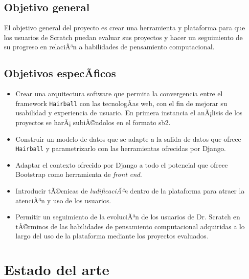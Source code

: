 \documentclass[a4paper, 12pt]{book}
\begin{document}
\section{Objetivo general}
\label{sec:objetivo-general}

El objetivo general del proyecto es crear una herramienta y plataforma para que los
usuarios de Scratch puedan evaluar sus proyectos y hacer un seguimiento de su progreso
en relaciÃ³n a habilidades de pensamiento computacional.


\section{Objetivos especÃ­ficos}
\label{sec:objetivos-especificos}

\begin{itemize}
  \item Crear una arquitectura software que permita la convergencia entre el framework \texttt{Hairball}
  con las tecnologÃ­as web, con el fin de mejorar su usabilidad y experiencia de usuario. En 
	primera instancia el anÃ¡lisis de los proyectos se harÃ¡ subiÃ©ndolos en el formato sb2.
  \item Construir un modelo de datos que se adapte a la salida de datos que ofrece \texttt{Hairball} y
  parametrizarlo con las herramientas ofrecidas por Django.
  \item Adaptar el contexto ofrecido por Django a todo el potencial que ofrece Bootstrap como
  herramienta de \emph{front end}.
  \item Introducir tÃ©cnicas de \emph{ludificaciÃ³n} dentro de la plataforma para atraer la atenciÃ³n y
  uso de los usuarios.
	\item Permitir un seguimiento de la evoluciÃ³n de los usuarios de Dr. Scratch en tÃ©rminos de 
	las habilidades de pensamiento computacional adquiridas a lo largo del uso de la plataforma
	mediante los proyectos evaluados.
\end{itemize}



\cleardoublepage
\chapter{Estado del arte}
\end{document}
